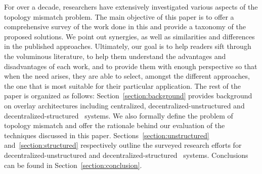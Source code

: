 For over a decade, researchers have extensively investigated  
various aspects of the topology mismatch problem.
The main objective of this paper is to offer a comprehensive 
survey of the work done in this and provide a
taxonomy of the proposed solutions. We point out synergies, as well as
similarities and differences in the published approaches. 
Ultimately, our goal is to help readers sift through 
the voluminous literature, to help them
understand the advantages and disadvantages of each work, and 
to provide them with enough perspective so that 
when the need arises, they are able to
select, amongst the different approaches, the one that is most suitable for
their particular application.
The rest of the paper is organized as follows: 
Section~\ref{section:background} provides background on
overlay architectures including centralized, decentralized-unstructured and
decentralized-structured \p\ systems.
We also formally define the problem of topology mismatch 
and offer the rationale behind our 
evaluation of the techniques discussed in this paper. 
Sections~\ref{section:unstructured} and~\ref{section:structured}
respectively outline the surveyed research efforts 
for decentralized-unstructured and decentralized-structured \p\ systems.
Conclusions can be found in Section~\ref{section:conclusion}.
